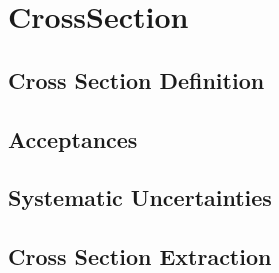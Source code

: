 \graphicspath{{Chapters/CrossSection/Figures/}}
\chapter{CrossSection}
\label{chap:Cross Section Measurements}

\section{Cross Section Definition}
\section{Acceptances}
\section{Systematic Uncertainties}
\section{Cross Section Extraction}
